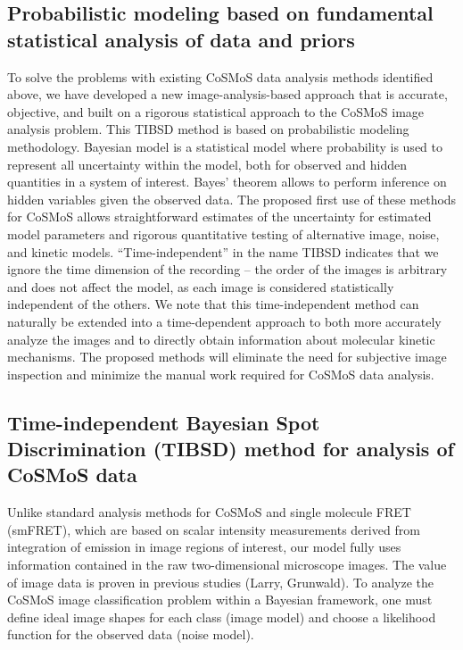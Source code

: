 \subsection{Probabilistic modeling based on fundamental statistical analysis of data and priors}

To solve the problems with existing CoSMoS data analysis methods identified above, we have developed a new image-analysis-based approach that is accurate, objective, and built on a rigorous statistical approach to the CoSMoS image analysis problem. This TIBSD method is based on probabilistic modeling methodology. Bayesian model is a statistical model where probability is used to represent all uncertainty within the model, both for observed and hidden quantities in a system of interest. Bayes' theorem allows to perform inference on hidden variables given the observed data. The proposed first use of these methods for CoSMoS allows straightforward estimates of the uncertainty for estimated model parameters and rigorous quantitative testing of alternative image, noise, and kinetic models. “Time-independent” in the name TIBSD indicates that we ignore the time dimension of the recording -- the order of the images is arbitrary and does not affect the model, as each image is considered statistically independent of the others. We note that this time-independent method can naturally be extended into a time-dependent approach to both more accurately analyze the images and to directly obtain information about molecular kinetic mechanisms.  The proposed methods will eliminate the need for subjective image inspection and minimize the manual work required for CoSMoS data analysis.

\subsection{Time-independent Bayesian Spot Discrimination (TIBSD) method for analysis of CoSMoS data}

Unlike standard analysis methods for CoSMoS and single molecule FRET (smFRET), which are based on scalar intensity measurements derived from integration of emission in image regions of interest, our model fully uses information contained in the raw two-dimensional microscope images. The value of image data is proven in previous studies (Larry, Grunwald). To analyze the CoSMoS image classification problem within a Bayesian framework, one must define ideal image shapes for each class (image model) and choose a likelihood function for the observed data (noise model).


